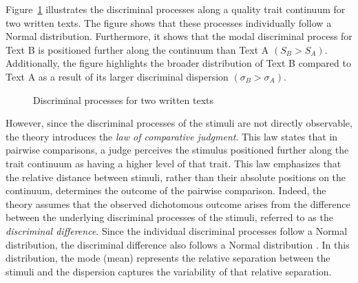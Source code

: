 \documentclass[
  authoryear,
  preprint,
  1p]{elsarticle}
\begin{document}
Figure~\ref{fig-discriminal_process} illustrates the discriminal
processes along a quality trait continuum for two written texts. The
figure shows that these processes individually follow a Normal
distribution. Furthermore, it shows that the modal discriminal process
for Text B is positioned further along the continuum than Text A
\((S_{B} > S_{A})\). Additionally, the figure highlights the broader
distribution of Text B compared to Text A as a result of its larger
discriminal dispersion \((\sigma_{B} > \sigma_{A})\).

\begin{figure}


\caption{\label{fig-discriminal_process}Discriminal processes for two
written texts}

\end{figure}%

However, since the discriminal processes of the stimuli are not directly
observable, the theory introduces the \emph{law of comparative
judgment}. This law states that in pairwise comparisons, a judge
perceives the stimulus positioned further along the trait continuum as
having a higher level of that trait. This law emphasizes that the
relative distance between stimuli, rather than their absolute positions
on the continuum, determines the outcome of the pairwise comparison.
Indeed, the theory assumes that the observed dichotomous outcome arises
from the difference between the underlying discriminal processes of the
stimuli, referred to as the \emph{discriminal difference}. Since the
individual discriminal processes follow a Normal distribution, the
discriminal difference also follows a Normal distribution
\citep{Andrich_1978}. In this distribution, the mode (mean) represents
the relative separation between the stimuli and the dispersion captures
the variability of that relative separation.
\end{document}
